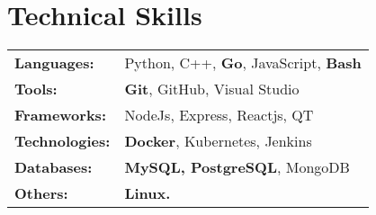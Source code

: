 \documentclass[ letterpaper ,11pt]{article}
\makeatletter
\newcommand{\resumeSubSubheading}[2]{
    \item
    \begin{tabular*}{0.97\textwidth}{l@{\extracolsep{\fill}}r}
      \textit{\small#1} & \textit{\small #2} \\
    \end{tabular*}\vspace{-9pt}
}
\newcommand{\resumeProjectHeading}[2]{
    \item
    \begin{tabular*}{0.97\textwidth}{l@{\extracolsep{\fill}}r}
      \small#1 & #2 \\
    \end{tabular*}\vspace{-2pt}
}
\newcommand{\resumeSubHeadingListStart}{\begin{itemize}[leftmargin=0.15in, label={}]}
\makeatother
\begin{document}
\section{Technical Skills}
\begin{tabularx}{\textwidth}{lX}
\vspace{1pt}
\textbf{Languages:} & \hspace{0.1cm} \small{Python, C++, \textbf{Go}, JavaScript, \textbf{Bash}} \\
\vspace{1pt}
\textbf{Tools:} & \hspace{0.1cm} \small{\textbf{Git}, GitHub, Visual Studio} \\
\vspace{1pt}
\textbf{Frameworks:} & \hspace{0.1cm} \small{NodeJs, Express, Reactjs, QT} \\
\vspace{1pt}
\textbf{Technologies:} & \hspace{0.1cm} \small{\textbf{Docker}, Kubernetes, Jenkins} \\
\vspace{1pt}
\textbf{Databases:} & \hspace{0.1cm} \small{\textbf{MySQL, PostgreSQL}, MongoDB} \\
\vspace{1pt}
\textbf{Others:} & \hspace{0.1cm} \small{\textbf{Linux.}} \\
\end{tabularx}



          
\end{document}
